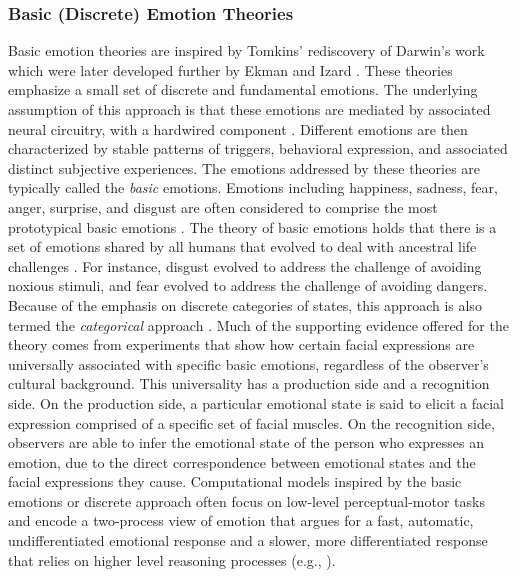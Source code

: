 \documentclass[12pt]{report}
\begin{document}
\subsubsection{Basic (Discrete) Emotion Theories}
\label{sec:discrete-emotions}

Basic emotion theories are inspired by Tomkins' \cite{tomkins:affect}
rediscovery of Darwin's work
\cite{darwin:emotion-expression,hess:darwin-emotion} which were later developed
further by Ekman \cite{ekman:argument-emotions} and Izard
\cite{izard:human-emotions}. These theories emphasize a small set of discrete
and fundamental emotions. The underlying assumption of this approach is that
these emotions are mediated by associated neural circuitry, with a hardwired
component \cite{ekman:argument-emotions}. Different emotions are then
characterized by stable patterns of triggers, behavioral expression, and
associated distinct subjective experiences. The emotions addressed by these
theories are typically called the \textit{basic} emotions. Emotions including
happiness, sadness, fear, anger, surprise, and disgust are often considered to
comprise the most prototypical basic emotions \cite{ekman:argument-emotions}.
The theory of basic emotions holds that there is a set of emotions shared by all
humans that evolved to deal with ancestral life challenges
\cite{ekman:argument-emotions}. For instance, disgust evolved to address the
challenge of avoiding noxious stimuli, and fear evolved to address the challenge
of avoiding dangers. Because of the emphasis on discrete categories of states,
this approach is also termed the \textit{categorical} approach
\cite{panskepp:affective-neuroscience}. Much of the supporting evidence offered
for the theory comes from experiments that show how certain facial expressions
are universally associated with specific basic emotions, regardless of the
observer's cultural background. This universality has a production side and a
recognition side. On the production side, a particular emotional state is said
to elicit a facial expression comprised of a specific set of facial muscles. On
the recognition side, observers are able to infer the emotional state of the
person who expresses an emotion, due to the direct correspondence between
emotional states and the facial expressions they cause. Computational models
inspired by the basic emotions or discrete approach often focus on low-level
perceptual-motor tasks and encode a two-process view of emotion that argues for
a fast, automatic, undifferentiated emotional response and a slower, more
differentiated response that relies on higher level reasoning processes (e.g.,
\cite{armony:computational-modeling-emotion}). \\
\end{document}
